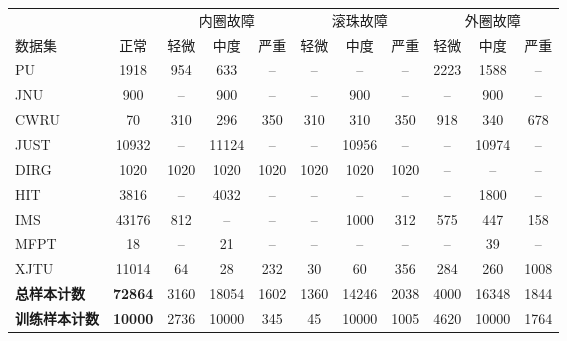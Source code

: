 \setlength{\tabcolsep}{3.5pt}
\renewcommand{\arraystretch}{1.2}
\begin{table}[htbp]
    \centering
    \begin{threeparttable}
        \label{tab:da-tmllm_Detailed_datasets_transposed}
        
        \begin{tabular}{l c ccc ccc ccc}
            \toprule
            & & \multicolumn{3}{c}{内圈故障} & \multicolumn{3}{c}{滚珠故障} & \multicolumn{3}{c}{外圈故障} \\
            \cmidrule(lr){3-5} \cmidrule(lr){6-8} \cmidrule(lr){9-11}
            数据集 & 正常 & 轻微 & 中度 & 严重 & 轻微 & 中度 & 严重& 轻微 & 中度 & 严重 \\
            \midrule
            PU \cite{PU} & 1918 & 954 & 633 & -- & -- & -- & -- & 2223 & 1588 & -- \\
            JNU \cite{s130608013} & 900 & -- & 900 & -- & -- & 900 & -- & -- & 900 & -- \\
            CWRU \cite{15467457} & 70 & 310 & 296 & 350 & 310 & 310 & 350 & 918 & 340 & 678 \\
            JUST \cite{JUST} & 10932 & -- & 11124 & -- & -- & 10956 & -- & -- & 10974 & -- \\
            DIRG \cite{DAGA2019252} & 1020 & 1020 & 1020 & 1020 & 1020 & 1020 & 1020 & -- & -- & -- \\
            HIT \cite{HIT} & 3816 & -- & 4032 & -- & -- & -- & -- & -- & 1800 & -- \\
            IMS \cite{IMS} & 43176 & 812 & -- & -- & -- & 1000 & 312 & 575 & 447 & 158 \\
            MFPT \cite{MFPT} & 18 & -- & 21 & -- & -- & -- & -- & -- & 39 & -- \\
            XJTU \cite{XJTU} & 11014 & 64 & 28 & 232 & 30 & 60 & 356 & 284 & 260 & 1008 \\
            \midrule
            \textbf{总样本计数} & \textbf{72864} & 3160 & 18054 & 1602 & 1360 & 14246 & 2038 & 4000 & 16348 & 1844 \\
            \textbf{训练样本计数} & \textbf{10000} & 2736 & 10000 & 345 & 45 & 10000 & 1005 & 4620 & 10000 & 1764 \\
            \bottomrule
        \end{tabular}
        \begin{tablenotes}

\end{tablenotes}
\end{threeparttable}
\end{table}
